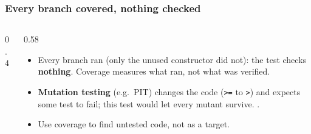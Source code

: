 \documentclass[aspectratio=169,10pt,compress]{beamer}
\begin{document}




\begin{frame}[t,fragile] \frametitle{Every branch covered, nothing checked}
	\vspace{-0.3cm}
  \begin{columns}[T]
    \begin{column}{0.4\textwidth}
    \end{column}
    \begin{column}{0.58\textwidth}
      \begin{itemize}\small
        \item Every branch ran (only the unused constructor did not): the test checks \textbf{nothing}. Coverage measures what ran, not what was verified.
        \item \textbf{Mutation testing} (e.g.\ PIT) changes the code (\texttt{>=} to \texttt{>}) and expects some test to fail;
              this test would let every mutant survive. .
        \item Use coverage to find untested code, not as a target.
      \end{itemize}
    \end{column}
  \end{columns}
\end{frame}

\end{document}
